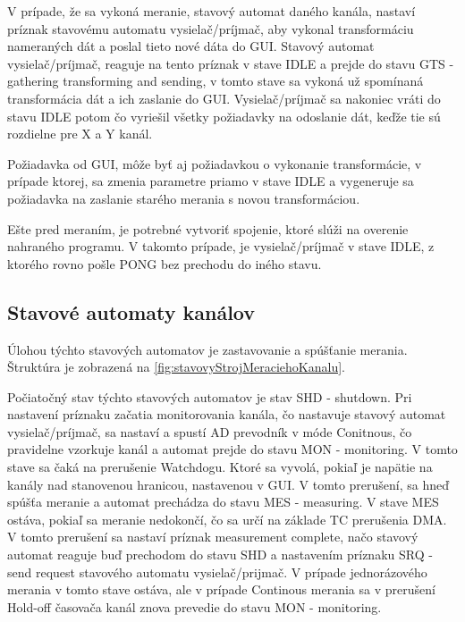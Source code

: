 \documentclass[main.tex]{subfiles}
\begin{document}
\begin{multicols*}{2}
			V prípade, že sa vykoná meranie, stavový automat daného kanála, nastaví príznak stavovému automatu vysielač/príjmač, aby vykonal transformáciu nameraných dát a poslal tieto nové dáta do GUI. Stavový automat vysielač/príjmač, reaguje na tento príznak v stave IDLE a prejde do stavu GTS - gathering transforming and sending, v tomto stave sa vykoná už spomínaná transformácia dát a ich zaslanie do GUI. Vysielač/príjmač sa nakoniec vráti do stavu IDLE potom čo vyriešil všetky požiadavky na odoslanie dát, keďže tie sú rozdielne pre X a Y kanál.
			
			Požiadavka od GUI, môže byť aj požiadavkou o vykonanie transformácie, v prípade ktorej, sa zmenia parametre priamo v stave IDLE a vygeneruje sa požiadavka na zaslanie starého merania s novou transformáciou.
			
			
			
			\vskip 0.25cm
			
			Ešte pred meraním, je potrebné vytvoriť spojenie, ktoré slúži na overenie nahraného programu. V takomto prípade, je vysielač/príjmač v stave IDLE, z ktorého rovno pošle PONG bez prechodu do iného stavu.
			
			\subsection{Stavové automaty kanálov}
			Úlohou týchto stavových automatov je zastavovanie a spúšťanie merania. Štruktúra je zobrazená na \cref{fig:stavovyStrojMeraciehoKanalu}.
			
			
			\vskip 0.25cm
			
			
			Počiatočný stav týchto stavových automatov je stav SHD - shutdown. Pri nastavení príznaku začatia monitorovania kanála, čo nastavuje stavový automat vysielač/príjmač, sa nastaví a spustí AD prevodník v móde Conitnous, čo pravidelne vzorkuje kanál a automat prejde do stavu MON - monitoring. V tomto stave sa čaká na prerušenie Watchdogu. Ktoré sa vyvolá, pokiaľ je napätie na kanály nad stanovenou hranicou, nastavenou v GUI. V tomto prerušení, sa hneď spúšťa meranie a automat prechádza do stavu MES - measuring. V stave MES ostáva, pokiaľ sa meranie nedokončí, čo sa určí na základe TC prerušenia DMA. V tomto prerušení sa nastaví príznak measurement complete, načo stavový automat reaguje buď prechodom do stavu SHD a nastavením príznaku SRQ - send request stavového automatu vysielač/prijmač. V prípade jednorázového merania v tomto stave ostáva, ale v prípade Continous merania sa v prerušení Hold-off časovača kanál znova prevedie do stavu MON - monitoring. 
			

\end{multicols*}
\end{document}
